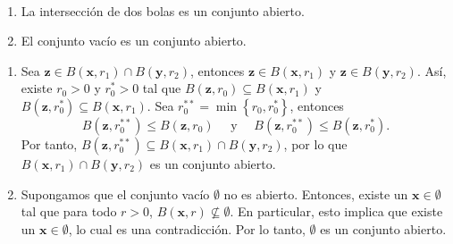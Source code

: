 \newpage

\begin{proposition}~
    \begin{enumerate}[label=\roman*.]
        \item La intersección de dos bolas es un conjunto abierto.
        \item El conjunto vacío es un conjunto abierto.
    \end{enumerate}
    \demostracion
    \begin{enumerate}[label=\roman*.]
        \item Sea $\mathbf{z} \in B(\mathbf{x}, r_1) \cap B(\mathbf{y}, r_2)$, entonces $\mathbf{z} \in B(\mathbf{x}, r_1)$ y $\mathbf{z} \in B(\mathbf{y}, r_2)$. Así, existe $r_0 > 0$ y $r_0^{*} > 0$ tal que $B(\mathbf{z}, r_0) \subseteq B(\mathbf{x}, r_1)$ y $B(\mathbf{z}, r_0^{*}) \subseteq B(\mathbf{x}, r_1)$. Sea $r_0^{**} = \min \left\{ r_0, r_0^{*} \right\}$, entonces
        $$B(\mathbf{z}, r_0^{**}) \leq B(\mathbf{z}, r_0) \quad \text{ y } \quad B(\mathbf{z}, r_0^{**}) \leq B(\mathbf{z}, r_0^{*}).$$
        Por tanto, $B(\mathbf{z}, r_0^{**}) \subseteq B(\mathbf{x}, r_1) \cap B(\mathbf{y}, r_2)$, por lo que $B(\mathbf{x}, r_1) \cap B(\mathbf{y}, r_2)$ es un conjunto abierto.
        \item Supongamos que el conjunto vacío $\emptyset$ no es abierto. Entonces, existe un $\mathbf{x} \in \emptyset$ tal que para todo $r > 0$, $B(\mathbf{x}, r) \nsubseteq \emptyset$. En particular, esto implica que existe un $\mathbf{x} \in \emptyset$, lo cual es una contradicción. Por lo tanto, $\emptyset$ es un conjunto abierto.
    \end{enumerate}
\end{proposition}
